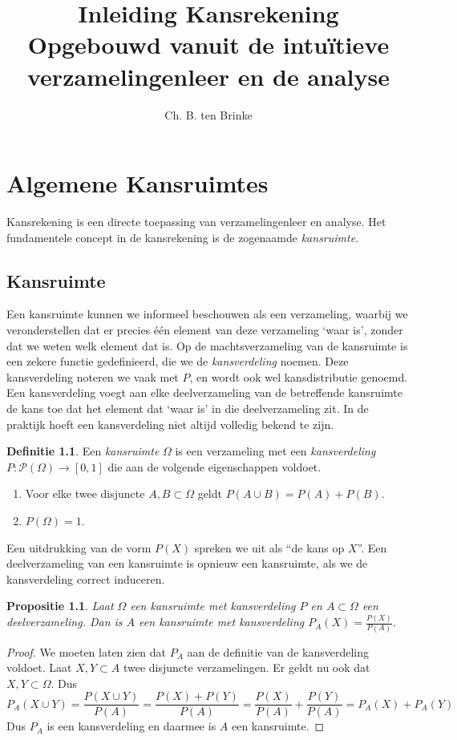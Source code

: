 \documentclass[a4paper]{report}
\title{Inleiding Kansrekening \\ \small{Opgebouwd vanuit de intu\"itieve verzamelingenleer en de analyse}}
\author{Ch. B. ten Brinke}
\newtheorem{proposition}[theorem]{Propositie}
\theoremstyle{definition}
\newtheorem{definition}[theorem]{Definitie}
\begin{document}
\maketitle

\chapter{Algemene Kansruimtes}
Kansrekening is een directe toepassing van verzamelingenleer en analyse.
Het fundamentele concept in de kansrekening is de zogenaamde \emph{kansruimte}.



\section{Kansruimte}
Een kansruimte kunnen we informeel beschouwen als een verzameling, waarbij we veronderstellen dat er precies \'e\'en element van deze verzameling `waar is', zonder dat we weten welk element dat is.
Op de machtsverzameling van de kansruimte is een zekere functie gedefinieerd, die we de \emph{kansverdeling} noemen.
Deze kansverdeling noteren we vaak met $P$, en wordt ook wel kansdistributie genoemd.
Een kansverdeling voegt aan elke deelverzameling van de betreffende kansruimte de kans toe dat het element dat `waar is' in die deelverzameling zit.
In de praktijk hoeft een kansverdeling niet altijd volledig bekend te zijn.

\begin{definition}
    Een \emph{kansruimte} $\Omega$ is een verzameling met een \emph{kansverdeling} $P: \mathcal P(\Omega) \to [0,1]$  die aan de volgende eigenschappen voldoet.
    \begin{enumerate}[i]
        \item Voor elke twee disjuncte $A,B \subset \Omega$ geldt $P(A \cup B) = P(A) + P(B)$.
        \item $P(\Omega) = 1$.
    \end{enumerate}
\end{definition}

Een uitdrukking van de vorm $P(X)$ spreken we uit als ``de kans op $X$''.
Een deelverzameling van een kansruimte is opnieuw een kansruimte, als we de kansverdeling correct induceren.
\begin{proposition}
    Laat $\Omega$ een kansruimte met kansverdeling $P$ en $A \subset \Omega$ een deelverzameling.
    Dan is $A$ een kansruimte met kansverdeling $P_A(X) = \frac{P(X)}{P(A)}$.
\end{proposition}
\begin{proof}
    We moeten laten zien dat $P_A$ aan de definitie van de kansverdeling voldoet.
    Laat $X,Y \subset A$ twee disjuncte verzamelingen.
    Er geldt nu ook dat $X,Y \subset \Omega$.
    Dus \[ P_A(X \cup Y) = \frac{P(X \cup Y)}{P(A)} = \frac{P(X) + P(Y)}{P(A)} = \frac{P(X)}{P(A)} + \frac{P(Y)}{P(A)} = P_A(X) + P_A(Y) \]
    Dus $P_A$ is een kansverdeling en daarmee is $A$ een kansruimte.
\end{proof}
\end{document}
